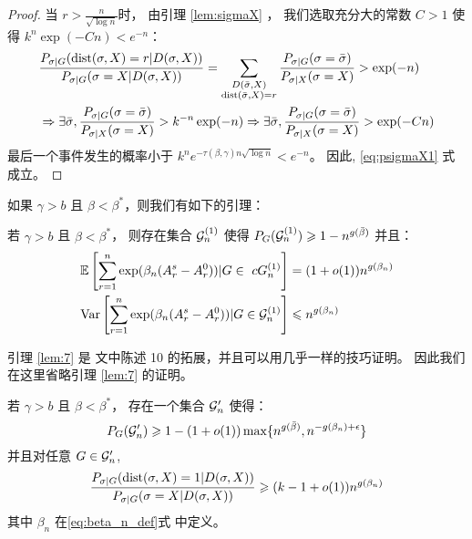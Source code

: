 \begin{proof}
  当 $r>\frac{n}{\sqrt{\log n}}$时，
  由引理 \ref{lem:sigmaX} ，
  我们选取充分大的常数  $C>1$
  使得 $k^n\exp(-Cn) < e^{-n}$：
  \begin{align*}
  &\frac{P_{\sigma|G}(\operatorname{dist}(\sigma, X)=r | D(\sigma, X))}
  {P_{\sigma|G}(\sigma=X | D(\sigma, X))} = 
  \sum_{\substack{D(\bar{\sigma}, X) \\ 
  \operatorname{dist}(\bar{\sigma}, X)=r}} \frac{P_{\sigma | G}(\sigma = \bar{\sigma}) }{P_{\sigma | X}(\sigma = X)} > \exp(-n)\\
  &\Rightarrow \exists \bar{\sigma},
  \frac{P_{\sigma | G}(\sigma = \bar{\sigma}) }{P_{\sigma | X}(\sigma = X)} > k^{-n}\exp(-n)
  \Rightarrow \exists \bar{\sigma},
  \frac{P_{\sigma | G}(\sigma = \bar{\sigma}) }{P_{\sigma | X}(\sigma = X)} > \exp(-Cn)\\
  \end{align*}
  最后一个事件发生的概率小于 $k^ne^{-\tau(\beta, \gamma) n\sqrt{\log n}}<e^{-n}$。
  因此,   \eqref{eq:psigmaX1} 式成立。
  \end{proof}

  如果 $\gamma > b$ 且 $\beta < \beta^*$，则我们有如下的引理：
 \begin{lemma}\label{lem:7}
	若 $\gamma > b$ 且 $\beta < \beta^*$，
  则存在集合 $\mathcal{G}^{(1)}_n$ 使得
	$P_G(\mathcal{G}^{(1)}_n) \geqslant 1-n^{g(\bar{\beta})}$
	并且：
 \begin{align}
	\mathbb{E}\left[
    \sum_{r=1}^n \exp(\beta_n (A_r^s - A_r^0)) | G \in \   cG^{(1)}_n\right] &= (1+o(1))n^{g(\beta_n)} \\
	\operatorname{\mathrm{Var}} \left[
    \sum_{r=1}^n \exp(\beta_n (A_r^s - A_r^0)) | G \in \mathcal{G}^{(1)}_n
    \right] &\leqslant n^{g(\beta_n)}
	\end{align}
\end{lemma}
引理 \ref{lem:7} 是 \citet{ye2020exact} 文中陈述 10 
的拓展，并且可以用几乎一样的技巧证明。
因此我们在这里省略引理 \ref{lem:7} 的证明。

\begin{lemma}\label{prop:large2}
	若 $\gamma > b$ 且 $\beta < \beta^*$，
 存在一个集合 $\mathcal{G}'_n$ 使得：
\begin{equation}
	P_G(\mathcal{G}'_n) \geqslant 1 - (1+o(1))\max\{n^{g(\bar{\beta})}, n^{- g(\beta_n) + \epsilon} \}
	\end{equation}
	并且对任意 $G \in \mathcal{G}'_n$,
\begin{equation}\label{eq:diff1g}
	\frac{P_{\sigma|G}(\operatorname{dist}(\sigma, X)=1 | D(\sigma, X))}
	{P_{\sigma|G}(\sigma=X | D(\sigma, X))} \geqslant (k-1+o(1))n^{g(\beta_n)}
	\end{equation}
  其中 $\beta_n$ 在\eqref{eq:beta_n_def}式 中定义。
\end{lemma}

